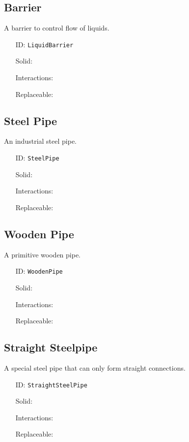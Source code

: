\subsection{Barrier}\label{subsec:blocks_barrier}
A barrier to control flow of liquids.
\newline
\begin{itemize}[nosep]
    \item[ID:] \texttt{LiquidBarrier}
    \item[Solid:]  \Checkmark \item[Interactions:]  \Checkmark \item[Replaceable:]  \XSolidBrush
\end{itemize}

\subsection{Steel Pipe}\label{subsec:blocks_steel pipe}
An industrial steel pipe.
\newline
\begin{itemize}[nosep]
    \item[ID:] \texttt{SteelPipe}
    \item[Solid:]  \Checkmark \item[Interactions:]  \XSolidBrush \item[Replaceable:]  \XSolidBrush
\end{itemize}

\subsection{Wooden Pipe}\label{subsec:blocks_wooden pipe}
A primitive wooden pipe.
\newline
\begin{itemize}[nosep]
    \item[ID:] \texttt{WoodenPipe}
    \item[Solid:]  \Checkmark \item[Interactions:]  \XSolidBrush \item[Replaceable:]  \XSolidBrush
\end{itemize}

\subsection{Straight Steelpipe}\label{subsec:blocks_straight steelpipe}
A special steel pipe that can only form straight connections.
\newline
\begin{itemize}[nosep]
    \item[ID:] \texttt{StraightSteelPipe}
    \item[Solid:]  \Checkmark \item[Interactions:]  \XSolidBrush \item[Replaceable:]  \XSolidBrush
\end{itemize}

